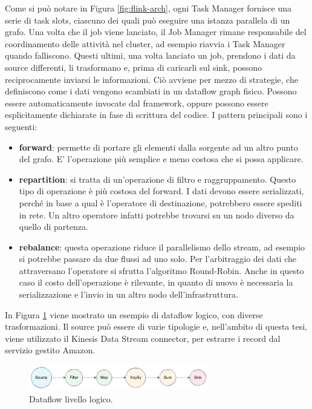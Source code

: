 Come si può notare in Figura \ref{fig:flink-arch}, ogni Task Manager fornisce una serie di task slots, ciascuno dei quali può eseguire una istanza parallela di un grafo. Una volta che il job viene lanciato, il Job Manager rimane responsabile del coordinamento delle attività nel cluster, ad esempio riavvia i Task Manager quando falliscono. Questi ultimi, una volta lanciato un job, prendono i dati da source differenti, li trasformano e, prima di caricarli sul sink, possono reciprocamente inviarsi le informazioni. 
Ciò avviene per mezzo di strategie, che definiscono come i dati vengono scambiati in un dataflow graph fisico. Possono essere automaticamente invocate dal framework, oppure possono essere esplicitamente dichiarate in fase di scrittura del codice. I pattern principali sono i seguenti:

\begin{itemize}
	\item \textbf{forward}: permette di portare gli elementi dalla sorgente ad un altro punto del grafo. E' l'operazione più semplice e meno costosa che si possa applicare.
	\item \textbf{repartition}: si tratta di un'operazione di filtro e raggruppamento. Questo tipo di operazione è più costosa del forward. I dati devono essere serializzati, perché in base a qual è l'operatore di destinazione, potrebbero essere spediti in rete. Un altro operatore infatti potrebbe trovarsi su un nodo diverso da quello di partenza.
	\item \textbf{rebalance}: questa operazione riduce il parallelismo dello stream, ad esempio si potrebbe passare da due flussi ad uno solo. Per l'arbitraggio dei dati che attraversano l'operatore si sfrutta l'algoritmo Round-Robin. Anche in questo caso il costo dell'operazione è rilevante, in quanto di nuovo è necessaria la serializzazione e l'invio in un altro nodo dell'infrastruttura.
\end{itemize}  

In Figura \ref{fig:dataflow-l} viene mostrato un esempio di dataflow logico, con diverse trasformazioni. Il source può essere di varie tipologie e, nell'ambito di questa tesi, viene utilizzato il Kinesis Data Stream connector, per estrarre i record dal servizio gestito Amazon. %

\begin{figure}[htbp]
    \centering
    \includegraphics[width=0.7\textwidth]{figures/logical-dag.png}
    \caption{Dataflow livello logico.}
    \label{fig:dataflow-l}
\end{figure}  

